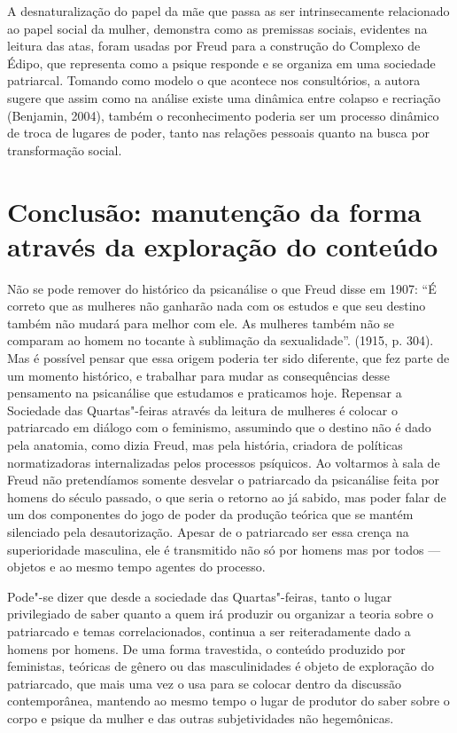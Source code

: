 A desnaturalização do papel da mãe que passa as ser intrinsecamente
relacionado ao papel social da mulher, demonstra como as premissas
sociais, evidentes na leitura das atas, foram usadas por Freud para a
construção do Complexo de Édipo, que representa como a psique responde e
se organiza em uma sociedade patriarcal. Tomando como modelo o que
acontece nos consultórios, a autora sugere que assim como na análise
existe uma dinâmica entre colapso e recriação (Benjamin, 2004), também o
reconhecimento poderia ser um processo dinâmico de troca de lugares de
poder, tanto nas relações pessoais quanto na busca por transformação
social.

\section{Conclusão: manutenção da forma através da exploração do
conteúdo}

Não se pode remover do histórico da psicanálise o que Freud disse em
1907: ``É correto que as mulheres não ganharão nada com os estudos e que
seu destino também não mudará para melhor com ele. As mulheres também
não se comparam ao homem no tocante à sublimação da sexualidade''.
(1915, p. 304). Mas é possível pensar que essa origem poderia ter sido
diferente, que fez parte de um momento histórico, e trabalhar para mudar
as consequências desse pensamento na psicanálise que estudamos e
praticamos hoje. Repensar a Sociedade das Quartas"-feiras através da
leitura de mulheres é colocar o patriarcado em diálogo com o feminismo,
assumindo que o destino não é dado pela anatomia, como dizia Freud, mas
pela história, criadora de políticas normatizadoras internalizadas pelos
processos psíquicos. Ao voltarmos à sala de Freud não pretendíamos
somente desvelar o patriarcado da psicanálise feita por homens do século
passado, o que seria o retorno ao já sabido, mas poder falar de um dos
componentes do jogo de poder da produção teórica que se mantém
silenciado pela desautorização. Apesar de o patriarcado ser essa crença
na superioridade masculina, ele é transmitido não só por homens mas por
todos --- objetos e ao mesmo tempo agentes do processo.

Pode"-se dizer que desde a sociedade das Quartas"-feiras, tanto o lugar
privilegiado de saber quanto a quem irá produzir ou organizar a teoria
sobre o patriarcado e temas correlacionados, continua a ser
reiteradamente dado a homens por homens. De uma forma travestida, o
conteúdo produzido por feministas, teóricas de gênero ou das
masculinidades é objeto de exploração do patriarcado, que mais uma vez o
usa para se colocar dentro da discussão contemporânea, mantendo ao mesmo
tempo o lugar de produtor do saber sobre o corpo e psique da mulher e
das outras subjetividades não hegemônicas.

